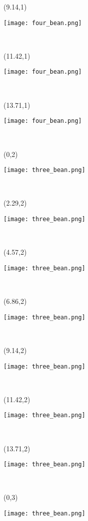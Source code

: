 \documentclass[a4paper]{article}
\newcommand{\myXfourBean}[0]{
\texttt{[image: four\_bean.png]}
}
\newcommand{\myXthreeBean}[0]{
\texttt{[image: three\_bean.png]}
}
\newcommand{\mycard}[5]{%
	\tiny #1 #2
	\hspace{-0.75cm} \large#3\\
}
\begin{document}
\begin{textblock}{2.29}(9.14,1)
\mycard{}{}{
\myXfourBean
}{}{} 
\end{textblock}

\begin{textblock}{2.29}(11.42,1)
\mycard{}{}{
\myXfourBean
}{}{} 
\end{textblock}

\begin{textblock}{2.29}(13.71,1)
\mycard{}{}{
\myXfourBean
}{}{} 
\end{textblock}


\begin{textblock}{2.29}(0,2)
\mycard{}{}{
\myXthreeBean
}{}{} 
\end{textblock}

\begin{textblock}{2.29}(2.29,2)
\mycard{}{}{
\myXthreeBean
}{}{} 
\end{textblock}

\begin{textblock}{2.29}(4.57,2)
\mycard{}{}{
\myXthreeBean
}{}{} 
\end{textblock}

\begin{textblock}{2.29}(6.86,2)
\mycard{}{}{
\myXthreeBean
}{}{} 
\end{textblock}

\begin{textblock}{2.29}(9.14,2)
\mycard{}{}{
\myXthreeBean
}{}{} 
\end{textblock}

\begin{textblock}{2.29}(11.42,2)
\mycard{}{}{
\myXthreeBean
}{}{} 
\end{textblock}

\begin{textblock}{2.29}(13.71,2)
\mycard{}{}{
\myXthreeBean
}{}{} 
\end{textblock}


\begin{textblock}{2.29}(0,3)
\mycard{}{}{
\myXthreeBean
}{}{} 
\end{textblock}
\end{document}
